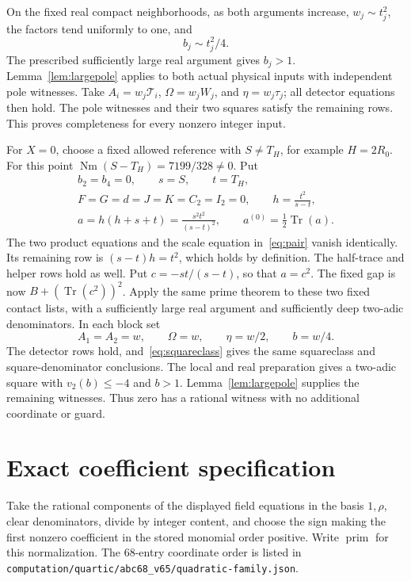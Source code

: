 \documentclass[11pt,a4paper]{article}
\DeclareMathOperator{\Tr}{Tr}\DeclareMathOperator{\Nm}{Nm}
\begin{document}
On the fixed real compact neighborhoods, as both arguments
increase, $w_j\sim t_j^2$, the factors tend uniformly to one, and
\[
                            b_j\sim t_j^2/4.
\]
The prescribed sufficiently large real argument gives $b_j>1$.
Lemma~\ref{lem:largepole} applies to both actual physical inputs
with independent pole witnesses. Take
$A_i=w_j\mathcal T_i$, $\Omega=w_jW_j$, and $\eta=w_j\tau_j$;
all detector equations then hold. The pole witnesses and their
two squares satisfy the remaining rows. This proves completeness
for every nonzero integer input.

For $X=0$, choose a fixed allowed reference with $S\ne T_H$,
for example $H=2R_0$. For this point
$\Nm(S-T_H)=7199/328\ne0$. Put
\begin{equation}\label{eq:zero}
\begin{gathered}
 b_2=b_4=0,\qquad s=S,\qquad t=T_H,\\
 F=G=d=J=K=C_2=I_2=0,\qquad
 h=\frac{t^2}{s-t},\\
 a=h(h+s+t)=\frac{s^2t^2}{(s-t)^2},\qquad
 a^{(0)}=\frac12\Tr(a).
\end{gathered}
\end{equation}
The two product equations and the scale equation in~\eqref{eq:pair}
vanish identically. Its remaining row is $(s-t)h=t^2$, which
holds by definition. The half-trace and helper rows hold as well.
Put $c=-st/(s-t)$, so that $a=c^2$.
The fixed gap is now $B+(\Tr(c^2))^2$. Apply the same prime
theorem to these two fixed contact lists, with a sufficiently
large real argument and sufficiently deep two-adic denominators.
In each block set
\[
                A_1=A_2=w,\qquad\Omega=w,\qquad
                \eta=w/2,\qquad b=w/4.
\]
The detector rows hold, and~\eqref{eq:squareclass} gives the
same squareclass and square-denominator conclusions. The local
and real preparation gives a two-adic square with $v_2(b)\le-4$
and $b>1$. Lemma~\ref{lem:largepole} supplies the remaining
witnesses. Thus zero has a rational witness with no additional
coordinate or guard.

\section{Exact coefficient specification}
Take the rational components of the displayed field equations in
the basis $1,\rho$, clear denominators, divide by integer content,
and choose the sign making the first nonzero coefficient in the
stored monomial order positive. Write $\operatorname{prim}$ for
this normalization. The 68-entry coordinate order is listed in
\nolinkurl{computation/quartic/abc68_v65/quadratic-family.json}.
\end{document}
